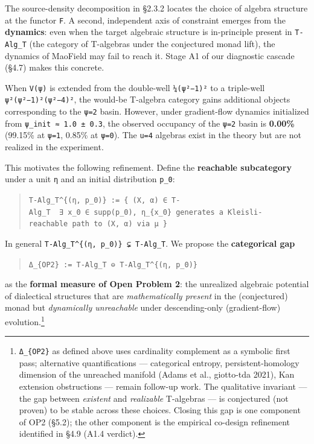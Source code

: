 \documentclass[
]{article}
\begin{document}
The source-density decomposition in §2.3.2 locates the choice of algebra
structure at the functor \texttt{F}. A second, independent axis of
constraint emerges from the \textbf{dynamics}: even when the target
algebraic structure is in-principle present in \texttt{T-Alg\_T} (the
category of T-algebras under the conjectured monad lift), the dynamics
of MaoField may fail to reach it. Stage A1 of our diagnostic cascade
(§4.7) makes this concrete.

When \texttt{V(ψ)} is extended from the double-well
\texttt{¼(\textbar{}ψ\textbar{}²−1)²} to a triple-well
\texttt{\textbar{}ψ\textbar{}²(\textbar{}ψ\textbar{}²−1)²(\textbar{}ψ\textbar{}²−4)²},
the would-be T-algebra category gains additional objects corresponding
to the \texttt{\textbar{}ψ\textbar{}=2} basin. However, under
gradient-flow dynamics initialized from
\texttt{\textbar{}ψ\textbar{}\_init\ ≈\ 1.0\ ±\ 0.3}, the observed
occupancy of the \texttt{\textbar{}ψ\textbar{}=2} basin is
\textbf{0.00\%} (99.15\% at \texttt{\textbar{}ψ\textbar{}=1}, 0.85\% at
\texttt{\textbar{}ψ\textbar{}=0}). The \texttt{u=4} algebras exist in
the theory but are not realized in the experiment.

This motivates the following refinement. Define the \textbf{reachable
subcategory} under a unit \texttt{η} and an initial distribution
\texttt{p\_0}:

\begin{quote}
\texttt{T-Alg\_T\^{}\{(η,\ p\_0)\}\ :=\ \{\ (X,\ α)\ ∈\ T-Alg\_T\ \textbar{}\ ∃\ x\_0\ ∈\ supp(p\_0),\ η\_\{x\_0\}\ generates\ a\ Kleisli-reachable\ path\ to\ (X,\ α)\ via\ μ\ \}}
\end{quote}

In general \texttt{T-Alg\_T\^{}\{(η,\ p\_0)\}\ ⊊\ T-Alg\_T}. We propose
the \textbf{categorical gap}

\begin{quote}
\texttt{Δ\_\{OP2\}\ :=\ \textbar{}T-Alg\_T\textbar{}\ ⊖\ \textbar{}T-Alg\_T\^{}\{(η,\ p\_0)\}\textbar{}}
\end{quote}

as the \textbf{formal measure of Open Problem 2}: the unrealized
algebraic potential of dialectical structures that are
\emph{mathematically present} in the (conjectured) monad but
\emph{dynamically unreachable} under descending-only (gradient-flow)
evolution.\footnote{\texttt{Δ\_\{OP2\}} as defined above uses
  cardinality complement as a symbolic first pass; alternative
  quantifications --- categorical entropy, persistent-homology dimension
  of the unreached manifold (Adams et al., giotto-tda 2021), Kan
  extension obstructions --- remain follow-up work. The qualitative
  invariant --- the gap between \emph{existent} and \emph{realizable}
  T-algebras --- is conjectured (not proven) to be stable across these
  choices. Closing this gap is one component of OP2 (§5.2); the other
  component is the empirical co-design refinement identified in §4.9
  (A1.4 verdict).}
\end{document}
